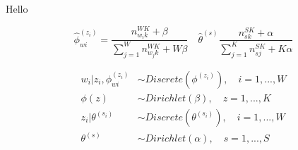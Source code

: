 \documentclass[landscape,final]{baposter}
\begin{document}
\setlength{\bibspacing}{\baselineskip}

Hello

\begin{equation}
  \label{eq:model}
    \hat{ \phi}_{wi}^{(z_i)} = \frac{n^{WK}_{w_{i}k}+ \beta}{\sum^W_{j=1}n^{WK}_{w_{j}k}+ W \beta} \quad \hat{\theta}^{(s)} \frac{n^{SK}_{sk} +\alpha}{\sum^K_{j=1}n^{SK}_{sj}+ K \alpha}
\end{equation}

\begin{equation}
  \label{eq:dists}
  \begin{aligned}
    w_i|z_i, \phi_{wi}^{(z_i)} & \sim Discrete(\phi^{(z_i)}), \quad i = 1, ..., W \\
    \phi{(z)}  & \sim  Dirichlet(\beta), \quad z = 1, ..., K \\
    z_i | \theta^{(s_i)} & \sim  Discrete(\theta^{(s_i)}), \quad i = 1, ..., W \\
    \theta^{(s)} & \sim  Dirichlet(\alpha), \quad s = 1, ..., S \\
  \end{aligned}
\end{equation}
\end{document}

